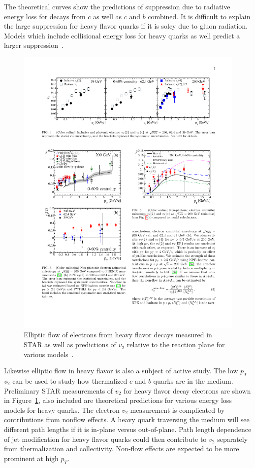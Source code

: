 The theoretical curves show the predictions of suppression due to radiative energy loss for decays from $c$ as well as $c$ and $b$ combined. It is difficult to explain the large suppression for heavy flavor quarks if it is soley due to gluon radiation. Models which include collisional energy loss for heavy quarks as well predict a larger suppression~\cite{dfqm2014}.

\begin{figure}[htbp]
\begin{center}
\includegraphics[scale=1.5]{Plots/Intro/npe_v2.pdf}
\end{center}
\caption[NPE $v_2$]{Elliptic flow of electrons from heavy flavor decays measured in STAR as well as predictions of $v_2$ relative to the reaction plane for various models~\cite{musNPEv2}.}
\label{fig:npe_v2_intro}
\end{figure}

Likewise elliptic flow in heavy flavor is also a subject of active study. The low $p_T$ $v_2$ can be used to study how thermalized $c$ and $b$ quarks are in the medium. Preliminary STAR measurements of $v_2$ for heavy flavor decay electrons are shown in Figure~\ref{fig:npe_v2_intro}, also included are theoretical predictions for various energy loss models for heavy quarks. The electron $v_2$ measurement is complicated by contributions from nonflow effects. A heavy quark traversing the medium will see different path lengths if it is in-plane versus out-of-plane. Path length dependence of jet modification for heavy flavor quarks could then contribute to $v_2$ separately from thermalization and collectivity. Non-flow effects are expected to be more prominent at high $p_T$.

